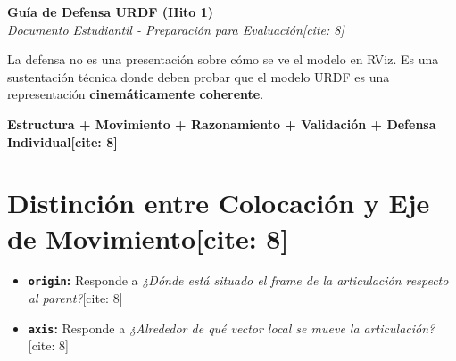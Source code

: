 \documentclass[11pt, a4paper]{article}
\begin{document}
\begin{center}
    \Large\textbf{\textcolor{ucbblue}{Guía de Defensa URDF (Hito 1)}}\\[0.2cm]
    \normalsize \textit{Documento Estudiantil - Preparación para Evaluación[cite: 8]}
\end{center}

\begin{tcolorbox}[colback=white, colframe=ucbblue, title=\textbf{Lo que debe demostrar}]
    La defensa no es una presentación sobre cómo se ve el modelo en RViz. Es una sustentación técnica donde deben probar que el modelo URDF es una representación \textbf{cinemáticamente coherente}.
    \begin{center}
        \textbf{Estructura + Movimiento + Razonamiento + Validación + Defensa Individual[cite: 8]}
    \end{center}
\end{tcolorbox}

\section{Distinción entre Colocación y Eje de Movimiento[cite: 8]}
\begin{center}
\end{center}
\begin{itemize}
    \item \textbf{\texttt{origin}:} Responde a \textit{¿Dónde está situado el frame de la articulación respecto al parent?}[cite: 8]
    \item \textbf{\texttt{axis}:} Responde a \textit{¿Alrededor de qué vector local se mueve la articulación?}[cite: 8]
\end{itemize}
\end{document}
